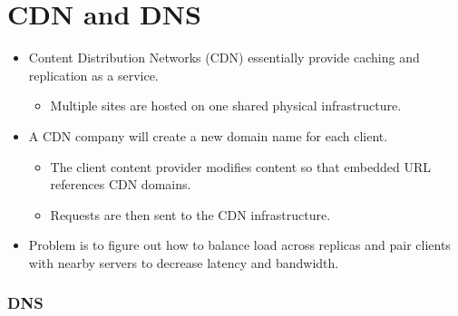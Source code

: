 \hypertarget{cdn-and-dns}{%
\section{CDN and DNS}\label{cdn-and-dns}}

\begin{itemize}
\tightlist
\item
  Content Distribution Networks (CDN) essentially provide caching and
  replication as a service.

  \begin{itemize}
  \tightlist
  \item
    Multiple sites are hosted on one shared physical infrastructure.
  \end{itemize}
\item
  A CDN company will create a new domain name for each client.

  \begin{itemize}
  \tightlist
  \item
    The client content provider modifies content so that embedded URL
    references CDN domains.
  \item
    Requests are then sent to the CDN infrastructure.
  \end{itemize}
\item
  Problem is to figure out how to balance load across replicas and pair
  clients with nearby servers to decrease latency and bandwidth.
\end{itemize}

\hypertarget{dns}{%
\subsubsection{DNS}\label{dns}}


